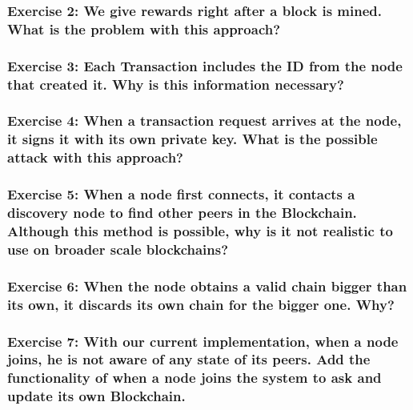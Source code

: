 \documentclass[12pt,a4paper]{article}
\theoremstyle{definition}
\begin{document}
\subsubsection*{Exercise 2: We give rewards right after a block is mined. What is the problem with this approach?}

\subsubsection*{Exercise 3: Each Transaction includes the ID from the node that created it. Why is this information necessary?}

\subsubsection*{Exercise 4: When a transaction request arrives at the node, it signs it with its own private key. What is the possible attack with this approach?}

\subsubsection*{Exercise 5: When a node first connects, it contacts a discovery node to find other peers in the Blockchain. Although this method is possible, why is it not realistic to use on broader scale blockchains? }

\subsubsection*{Exercise 6: When the node obtains a valid chain bigger than its own, it discards its own chain for the bigger one. Why? }

\subsubsection*{Exercise 7: With our current implementation, when a node joins, he is not aware of any state of its peers. Add the functionality of when a node joins the system to ask and update its own Blockchain.}



\end{document}
